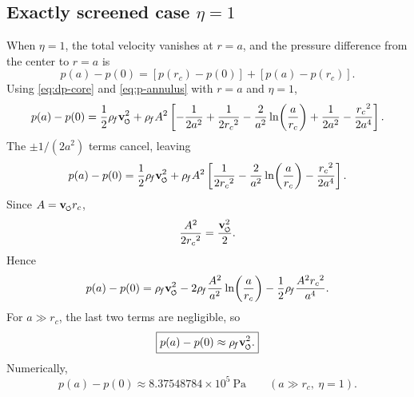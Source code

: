 \documentclass[11pt]{article}
\newcommand{\swirlarrow}{\mathchoice{\mkern-2mu\scriptstyle\boldsymbol{\circlearrowleft}}{\mkern-2mu\scriptstyle\boldsymbol{\circlearrowleft}}{\mkern-2mu\scriptscriptstyle\boldsymbol{\circlearrowleft}}{\mkern-2mu\scriptscriptstyle\boldsymbol{\circlearrowleft}}}
\newcommand{\vswirl}{\mathbf{v}_{\swirlarrow}}
\newcommand{\rhoF}{\rho_{\!f}}
\newcommand{\rc}{{r_c}}
\begin{document}
        \subsection{Exactly screened case \(\eta=1\)}
            
            When \(\eta=1\), the total velocity vanishes at \(r=a\), and the pressure difference from the center to \(r=a\) is
            \begin{equation}
                p(a)-p(0)
                =
                [p(\rc)-p(0)] + [p(a)-p(\rc)].
                \label{eq:p-total-a}
            \end{equation}
            Using \eqref{eq:dp-core} and \eqref{eq:p-annulus} with \(r=a\) and \(\eta=1\),
            \begin{equation}
                p(a)-p(0)
                =
                \frac{1}{2}\rhoF \vswirl^2
                +
                \rhoF A^2
                \left[
                    -\frac{1}{2a^2}+\frac{1}{2\rc^2}
                    -\frac{2}{a^2}\ln\!\left(\frac{a}{\rc}\right)
                    +\frac{1}{2a^2}-\frac{\rc^2}{2a^4}
                \right].
            \end{equation}
            The \(\pm 1/(2a^2)\) terms cancel, leaving
            \begin{equation}
                p(a)-p(0)
                =
                \frac{1}{2}\rhoF \vswirl^2
                +
                \rhoF A^2
                \left[
                    \frac{1}{2\rc^2}
                    -\frac{2}{a^2}\ln\!\left(\frac{a}{\rc}\right)
                    -\frac{\rc^2}{2a^4}
                \right].
                \label{eq:p-total-a-expanded}
            \end{equation}
            Since \(A=\vswirl \rc\),
            \[
                \frac{A^2}{2\rc^2} = \frac{\vswirl^2}{2}.
            \]
            Hence
            \begin{equation}
                p(a)-p(0)
                =
                \rhoF \vswirl^2
                -
                2\rhoF \frac{A^2}{a^2}\ln\!\left(\frac{a}{\rc}\right)
                -
                \frac{1}{2}\rhoF \frac{A^2 \rc^2}{a^4}.
                \label{eq:p-total-a-nearly}
            \end{equation}
            For \(a\gg \rc\), the last two terms are negligible, so
            \begin{equation}
                \boxed{
                    p(a)-p(0)\approx \rhoF \vswirl^2.
                }
                \label{eq:p-total-a-asymptotic}
            \end{equation}
            Numerically,
            \begin{equation}
                p(a)-p(0)
                \approx
                8.37548784\times 10^5\ \mathrm{Pa}
                \qquad
                (a\gg \rc,\ \eta=1).
                \label{eq:p-total-a-numeric}
            \end{equation}
        
\end{document}
